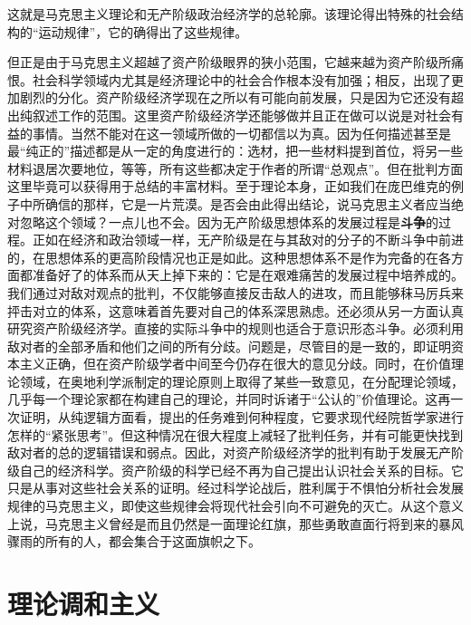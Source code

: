 \documentclass[fontset=fandol, a4paper, 12pt, openright]{ctexbook}
\begin{document}
这就是马克思主义理论和无产阶级政治经济学的总轮廓。该理论得出特殊的社会结构的“运动规律”，它的确得出了这些规律。

但正是由于马克思主义超越了资产阶级眼界的狭小范围，它越来越为资产阶级所痛恨。社会科学领域内尤其是经济理论中的社会合作根本没有加强；相反，出现了更加剧烈的分化。资产阶级经济学现在之所以有可能向前发展，只是因为它还没有超出纯叙述工作的范围。这里资产阶级经济学还能够做并且正在做可以说是对社会有益的事情。当然不能对在这一领域所做的一切都信以为真。因为任何描述甚至是最“纯正的”描述都是从一定的角度进行的：选材，把一些材料提到首位，将另一些材料退居次要地位，等等，所有这些都决定于作者的所谓“总观点”。但在批判方面这里毕竟可以获得用于总结的丰富材料。至于理论本身，正如我们在庞巴维克的例子中所确信的那样，它是一片荒漠。是否会由此得出结论，说马克思主义者应当绝对忽略这个领域？一点儿也不会。因为无产阶级思想体系的发展过程是\textbf{斗争}的过程。正如在经济和政治领域一样，无产阶级是在与其敌对的分子的不断斗争中前进的，在思想体系的更高阶段情况也正是如此。这种思想体系不是作为完备的在各方面都准备好了的体系而从天上掉下来的：它是在艰难痛苦的发展过程中培养成的。我们通过对敌对观点的批判，不仅能够直接反击敌人的进攻，而且能够秣马厉兵来抨击对立的体系，这意味着首先要对自己的体系深思熟虑。还必须从另一方面认真研究资产阶级经济学。直接的实际斗争中的规则也适合于意识形态斗争。必须利用敌对者的全部矛盾和他们之间的所有分歧。问题是，尽管目的是一致的，即证明资本主义正确，但在资产阶级学者中间至今仍存在很大的意见分歧。同时，在价值理论领域，在奥地利学派制定的理论原则上取得了某些一致意见，在分配理论领域，几乎每一个理论家都在构建自己的理论，并同时诉诸于“公认的”价值理论。这再一次证明，从纯逻辑方面看，提出的任务难到何种程度，它要求现代经院哲学家进行怎样的“紧张思考”。但这种情况在很大程度上减轻了批判任务，并有可能更快找到敌对者的总的逻辑错误和弱点。因此，对资产阶级经济学的批判有助于发展无产阶级自己的经济科学。资产阶级的科学已经不再为自己提出认识社会关系的目标。它只是从事对这些社会关系的证明。经过科学论战后，胜利属于不惧怕分析社会发展规律的马克思主义，即使这些规律会将现代社会引向不可避免的灭亡。从这个意义上说，马克思主义曾经是而且仍然是一面理论红旗，那些勇敢直面行将到来的暴风骤雨的所有的人，都会集合于这面旗帜之下。


\appendix %

\chapter{理论调和主义}
\end{document}
